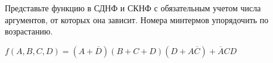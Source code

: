 \question Представьте функцию в СДНФ и СКНФ с обязательным учетом числа аргументов,
 от которых она зависит. Номера минтермов упорядочить по возрастанию.

$f(A,B,C,D) = (A+\overline{D})(B+C+D)(D+A\overline{C})+\overline{A}CD$